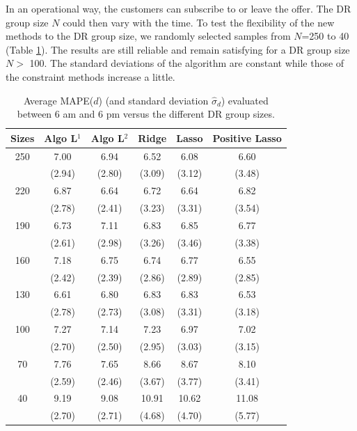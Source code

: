 \documentclass[journal]{IEEEtran}
\begin{document}
In an operational way, the customers can subscribe to or leave the offer. The DR group 
size $N$ could then vary with the time. To test the flexibility of the new methods to the 
DR group size, we randomly selected samples from $N$=250 to 40 (Table 
\ref{tab:mape_vs_taille}). The results are still reliable and remain satisfying for 
a DR group size $N>$ 100. The standard deviations of the algorithm 
are constant while those of the constraint methods increase a little.
\begin{table}[!h]
\caption{{\scriptsize Average MAPE($d$) (and standard deviation $\hat{\sigma}_d$) evaluated 
between 6 am and 6 pm versus the different DR group sizes.}}
\label{tab:mape_vs_taille}
\centering
\begin{scriptsize}
\begin{tabular}{c|c|c|c|c|c}
\hline
Sizes & Algo L$^1$  & Algo L$^2$ & Ridge & Lasso  & Positive Lasso  \\
\hline
    250 & 	7.00 & 6.94   & 6.52  	& 6.08  & 6.60 \\
    	& (2.94) & (2.80) & (3.09) 	& (3.12) & (3.48) \\
    220 & 	6.87 & 6.64   & 6.72  	& 6.64  & 6.82 \\
    	& (2.78) & (2.41) & (3.23) 	& (3.31) & (3.54) \\
    190 & 	6.73 & 7.11   & 6.83  	& 6.85  & 6.77 \\
    	& (2.61) & (2.98) & (3.26) 	& (3.46) & (3.38) \\
    160 & 	7.18 & 6.75   & 6.74  	& 6.77  & 6.55 \\
    	& (2.42) & (2.39) & (2.86) 	& (2.89) & (2.85) \\
    130 & 	6.61 & 6.80   & 6.83  	& 6.83  & 6.53 \\
    	& (2.78) & (2.73) & (3.08) 	& (3.31) & (3.18) \\
    100 & 	7.27 & 7.14   & 7.23  	& 6.97  & 7.02 \\
    	& (2.70) & (2.50) & (2.95) 	& (3.03) & (3.15) \\
     70 & 	7.76 & 7.65   & 8.66  	& 8.67  & 8.10 \\
     	& (2.59) & (2.46) & (3.67)	& (3.77) & (3.41) \\
     40 & 	9.19 & 9.08   & 10.91 	& 10.62 & 11.08 \\
     	& (2.70) & (2.71) & (4.68) 	& (4.70) & (5.77) \\
\hline
\end{tabular}
\end{scriptsize}
\end{table}
\end{document}
